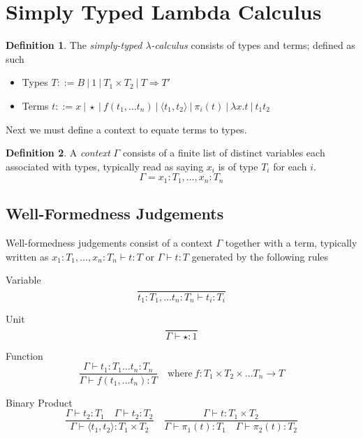 \documentclass{article}
\theoremstyle{definition}
\newtheorem{definition}{Definition}[section]
\begin{document}
\pagebreak
\section{Simply Typed Lambda Calculus}
\begin{definition}
    The \textit{simply-typed $\lambda$-calculus} consists of
    types and terms;
    defined as such
    \begin{itemize}
        \item Types
            $T ::= B 
            \ | \ 1
            \ | \ T_1 \times T_2
            \ | \ T \Rightarrow T \prime$
        \item Terms
            $t ::=  x
            \ |\ \star
            \ |\ f(t_1,\dots t_n)
            \ |\ \langle t_1, t_2 \rangle
            \ |\ \pi_i(t)
            \ |\ \lambda x.t
            \ |\ t_1 t_2$
    \end{itemize}
\end{definition}

\vspace{4mm}
Next we must define a context to equate terms to types.

\begin{definition}
A \textit{context} $\Gamma$ consists of a finite list of distinct variables each associated with types,
    typically read as saying $x_i$ is of type $T_i$ for each $i$.
    $$\Gamma =x_1 :T_1,\dots,x_n :T_n$$
\end{definition}

\subsection{Well-Formedness Judgements}
Well-formedness judgements consist of a context $\Gamma$ together with a term,
typically written as $x_1 :T_1,\dots, x_n :T_n \vdash t : T$ or $\Gamma \vdash t:T$
generated by the following rules 

Variable
$$
\frac{}{t_1 : T_1, \dots t_n : T_n \vdash t_i : T_i}
$$

Unit
$$
\frac{}{\Gamma \vdash \star : 1}
$$

Function
$$
\frac{\Gamma \vdash t_1 : T_1 \dots t_n : T_n}{\Gamma \vdash f(t_1,\dots t_n) : T}
\quad\textrm{where}\ f : T_1 \times T_2 \times \dots T_n \rightarrow T
$$

Binary Product
$$
\frac
{\Gamma \vdash t_2 : T_1 \quad \Gamma \vdash t_2 : T_2}
{\Gamma \vdash \langle t_1, t_2 \rangle : T_1 \times T_2}
\quad
\frac
{\Gamma \vdash t : T_1 \times T_2}
{\Gamma \vdash \pi_1(t) : T_1 \quad \Gamma \vdash \pi_2(t) : T_2}
$$
\end{document}

